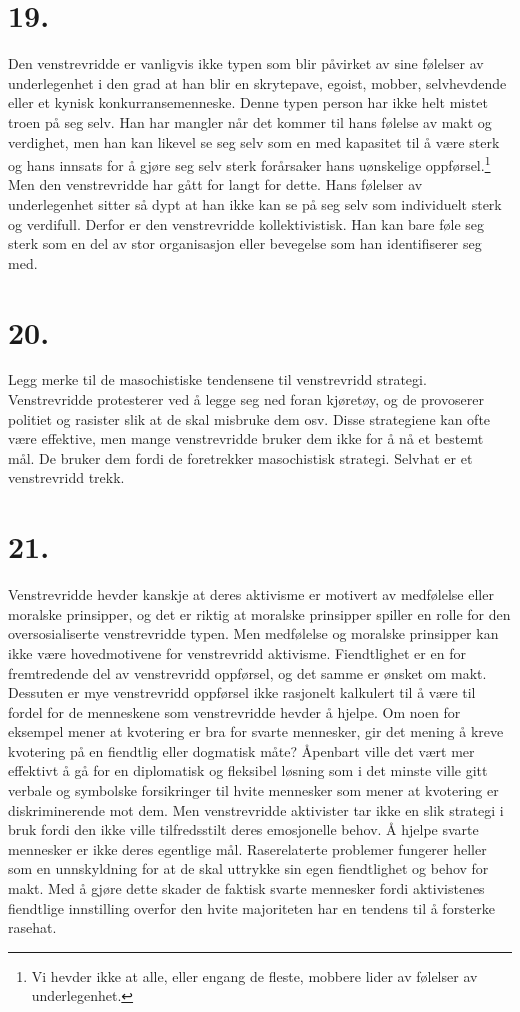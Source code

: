 \documentclass[oneside]{book}
\begin{document}
\section*{19.}
Den venstrevridde er vanligvis ikke typen som blir påvirket av sine følelser av underlegenhet i den grad at han blir en skrytepave, egoist, mobber, selvhevdende eller et kynisk konkurransemenneske. Denne typen person har ikke helt mistet troen på seg selv. Han har mangler når det kommer til hans følelse av makt og verdighet, men han kan likevel se seg selv som en med kapasitet til å være sterk og hans innsats for å gjøre seg selv sterk forårsaker hans uønskelige oppførsel.\footnote{Vi hevder ikke at alle, eller engang de fleste, mobbere lider av følelser av underlegenhet.} Men den venstrevridde har gått for langt for dette. Hans følelser av underlegenhet sitter så dypt at han ikke kan se på seg selv som individuelt sterk og verdifull. Derfor er den venstrevridde kollektivistisk. Han kan bare føle seg sterk som en del av stor organisasjon eller bevegelse som han identifiserer seg med.

\section*{20.}
Legg merke til de masochistiske tendensene til venstrevridd strategi. Venstrevridde protesterer ved å legge seg ned foran kjøretøy, og de provoserer politiet og rasister slik at de skal misbruke dem osv. Disse strategiene kan ofte være effektive, men mange venstrevridde bruker dem ikke for å nå et bestemt mål. De bruker dem fordi de foretrekker masochistisk strategi. Selvhat er et venstrevridd trekk.

\section*{21.}
Venstrevridde hevder kanskje at deres aktivisme er motivert av medfølelse eller moralske prinsipper, og det er riktig at moralske prinsipper spiller en rolle for den oversosialiserte venstrevridde typen. Men medfølelse og moralske prinsipper kan ikke være hovedmotivene for venstrevridd aktivisme. Fiendtlighet er en for fremtredende del av venstrevridd oppførsel, og det samme er ønsket om makt. Dessuten er mye venstrevridd oppførsel ikke rasjonelt kalkulert til å være til fordel for de menneskene som venstrevridde hevder å hjelpe. Om noen for eksempel mener at kvotering er bra for svarte mennesker, gir det mening å kreve kvotering på en fiendtlig eller dogmatisk måte? Åpenbart ville det vært mer effektivt å gå for en diplomatisk og fleksibel løsning som i det minste ville gitt verbale og symbolske forsikringer til hvite mennesker som mener at kvotering er diskriminerende mot dem. Men venstrevridde aktivister tar ikke en slik strategi i bruk fordi den ikke ville tilfredsstilt deres emosjonelle behov. Å hjelpe svarte mennesker er ikke deres egentlige mål. Raserelaterte problemer fungerer heller som en unnskyldning for at de skal uttrykke sin egen fiendtlighet og behov for makt. Med å gjøre dette skader de faktisk svarte mennesker fordi aktivistenes fiendtlige innstilling overfor den hvite majoriteten har en tendens til å forsterke rasehat.
\end{document}
